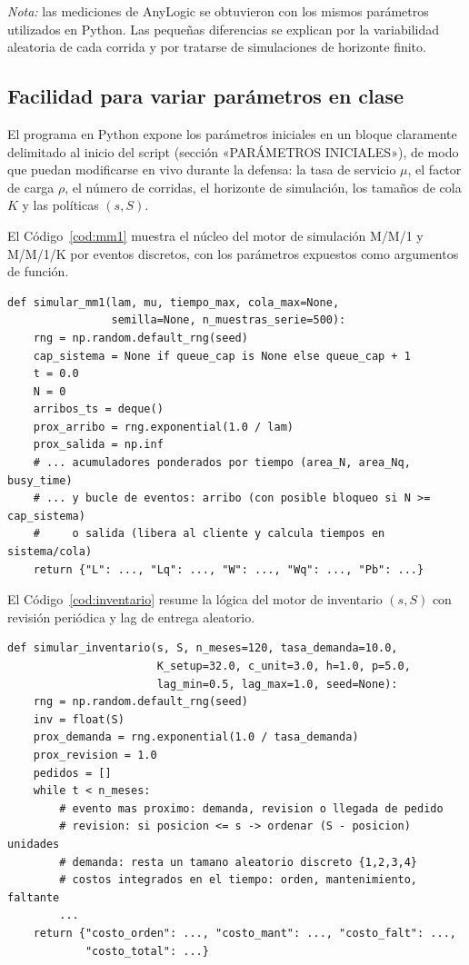 \documentclass{article}
\begin{document}
\textit{Nota:} las mediciones de AnyLogic se obtuvieron con los mismos
parámetros utilizados en Python. Las pequeñas diferencias se explican por
la variabilidad aleatoria de cada corrida y por tratarse de simulaciones de
horizonte finito.

\subsection{Facilidad para variar parámetros en clase}

El programa en Python expone los parámetros iniciales en un bloque
claramente delimitado al inicio del script (sección «PARÁMETROS
INICIALES»), de modo que puedan modificarse en vivo durante la defensa: la
tasa de servicio $\mu$, el factor de carga $\rho$, el número de corridas,
el horizonte de simulación, los tamaños de cola $K$ y las políticas
$(s,S)$.

El Código~\ref{cod:mm1} muestra el núcleo del motor de simulación M/M/1 y
M/M/1/K por eventos discretos, con los parámetros expuestos como
argumentos de función.

\begin{lstlisting}[caption={Núcleo del simulador M/M/1 / M/M/1/K (eventos discretos).}, label={cod:mm1}]
def simular_mm1(lam, mu, tiempo_max, cola_max=None,
                semilla=None, n_muestras_serie=500):
    rng = np.random.default_rng(seed)
    cap_sistema = None if queue_cap is None else queue_cap + 1
    t = 0.0
    N = 0
    arribos_ts = deque()
    prox_arribo = rng.exponential(1.0 / lam)
    prox_salida = np.inf
    # ... acumuladores ponderados por tiempo (area_N, area_Nq, busy_time)
    # ... y bucle de eventos: arribo (con posible bloqueo si N >= cap_sistema)
    #     o salida (libera al cliente y calcula tiempos en sistema/cola)
    return {"L": ..., "Lq": ..., "W": ..., "Wq": ..., "Pb": ...}
\end{lstlisting}

El Código~\ref{cod:inventario} resume la lógica del motor de inventario
$(s,S)$ con revisión periódica y lag de entrega aleatorio.

\begin{lstlisting}[caption={Núcleo del simulador de Inventario $(s,S)$.}, label={cod:inventario}]
def simular_inventario(s, S, n_meses=120, tasa_demanda=10.0,
                       K_setup=32.0, c_unit=3.0, h=1.0, p=5.0,
                       lag_min=0.5, lag_max=1.0, seed=None):
    rng = np.random.default_rng(seed)
    inv = float(S)
    prox_demanda = rng.exponential(1.0 / tasa_demanda)
    prox_revision = 1.0
    pedidos = []
    while t < n_meses:
        # evento mas proximo: demanda, revision o llegada de pedido
        # revision: si posicion <= s -> ordenar (S - posicion) unidades
        # demanda: resta un tamano aleatorio discreto {1,2,3,4}
        # costos integrados en el tiempo: orden, mantenimiento, faltante
        ...
    return {"costo_orden": ..., "costo_mant": ..., "costo_falt": ...,
            "costo_total": ...}
\end{lstlisting}
\end{document}
